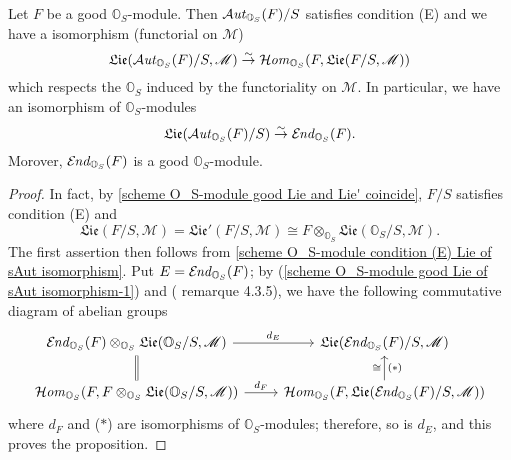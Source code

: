 \begin{proposition}\label{scheme O_S-module good Lie of sAut isomorphism}
Let $F$ be a good $\mathbb{O}_S$-module. Then $\operatorname{\mathcal{A}\hspace*{-0.2pt}\textit{ut}\hspace{0.5pt}}_{\mathbb{O}_S}(F)/S$ satisfies condition (E) and we have a isomorphism (functorial on $\mathscr{M}$)
\[\mathfrak{Lie}(\operatorname{\mathcal{A}\hspace*{-0.2pt}\textit{ut}\hspace{0.5pt}}_{\mathbb{O}_S}(F)/S,\mathscr{M})\stackrel{\sim}{\to} \operatorname{\mathcal{H}\hspace*{-0.4pt}\textit{om}\hspace{0.5pt}}_{\mathbb{O}_S}(F,\mathfrak{Lie}(F/S,\mathscr{M}))\]
which respects the $\mathbb{O}_S$ induced by the functoriality on $\mathscr{M}$. In particular, we have an isomorphism of $\mathbb{O}_S$-modules
\[\mathfrak{Lie}(\operatorname{\mathcal{A}\hspace*{-0.2pt}\textit{ut}\hspace{0.5pt}}_{\mathbb{O}_S}(F)/S)\stackrel{\sim}{\to} \operatorname{\mathcal{E}\hspace*{-1pt}\textit{nd}\hspace{0.5pt}}_{\mathbb{O}_S}(F).\]
Morover, $\operatorname{\mathcal{E}\hspace*{-1pt}\textit{nd}\hspace{0.5pt}}_{\mathbb{O}_S}(F)$ is a good $\mathbb{O}_S$-module.
\end{proposition}
\begin{proof}
In fact, by \cref{scheme O_S-module good Lie and Lie' coincide}, $F/S$ satisfies condition (E) and
\begin{equation}\label{scheme O_S-module good Lie of sAut isomorphism-1}
\mathfrak{Lie}(F/S,\mathscr{M})=\mathfrak{Lie}'(F/S,\mathscr{M})\cong F\otimes_{\mathbb{O}_S}\mathfrak{Lie}(\mathbb{O}_S/S,\mathscr{M}).
\end{equation}
The first assertion then follows from \cref{scheme O_S-module condition (E) Lie of sAut isomorphism}. Put $E=\operatorname{\mathcal{E}\hspace*{-1pt}\textit{nd}\hspace{0.5pt}}_{\mathbb{O}_S}(F)$; by (\ref{scheme O_S-module good Lie of sAut isomorphism-1}) and (\cite{SGA3} remarque 4.3.5), we have the following commutative diagram of abelian groups
\[\begin{tikzcd}
\sEnd_{\mathbb{O}_S}(F)\otimes_{\mathbb{O}_S}\mathfrak{Lie}(\mathbb{O}_S/S,\mathscr{M})\ar[d,equal]\ar[r,"d_E"]&\mathfrak{Lie}(\sEnd_{\mathbb{O}_S}(F)/S,\mathscr{M})\\
\sHom_{\mathbb{O}_S}(F,F\otimes_{\mathbb{O}_S}\mathfrak{Lie}(\mathbb{O}_S/S,\mathscr{M}))\ar[r,"d_F"]&\sHom_{\mathbb{O}_S}(F,\mathfrak{Lie}(\sEnd_{\mathbb{O}_S}(F)/S,\mathscr{M}))\ar[u,"\cong","(*)"']
\end{tikzcd}\]
where $d_F$ and ($*$) are isomorphisms of $\mathbb{O}_S$-modules; therefore, so is $d_E$, and this proves the proposition.
\end{proof}

